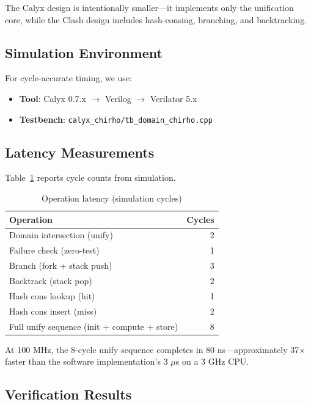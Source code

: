 \documentclass[11pt,a4paper]{article}
\begin{document}
The Calyx design is intentionally smaller---it implements only the unification
core, while the Clash design includes hash-consing, branching, and backtracking.

\subsection{Simulation Environment}
\label{subsec:simulation_chirho}

For cycle-accurate timing, we use:
\begin{itemize}
  \item \textbf{Tool}: Calyx 0.7.x $\rightarrow$ Verilog $\rightarrow$ Verilator 5.x
  \item \textbf{Testbench}: \texttt{calyx\_chirho/tb\_domain\_chirho.cpp}
\end{itemize}

\subsection{Latency Measurements}
\label{subsec:latency_chirho}

Table~\ref{tab:latency_chirho} reports cycle counts from simulation.

\begin{table}[ht]
\centering
\caption{Operation latency (simulation cycles)}
\label{tab:latency_chirho}
\begin{tabular}{lr}
\toprule
\textbf{Operation} & \textbf{Cycles} \\
\midrule
Domain intersection (unify) & 2 \\
Failure check (zero-test) & 1 \\
Branch (fork + stack push) & 3 \\
Backtrack (stack pop) & 2 \\
Hash cons lookup (hit) & 1 \\
Hash cons insert (miss) & 2 \\
Full unify sequence (init + compute + store) & 8 \\
\bottomrule
\end{tabular}
\end{table}

At 100 MHz, the 8-cycle unify sequence completes in 80 ns---approximately
37$\times$ faster than the software implementation's 3 $\mu$s on a 3 GHz CPU.

\subsection{Verification Results}
\label{subsec:verification_chirho}
\end{document}

